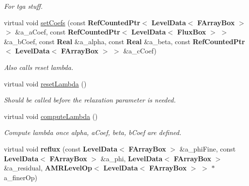 \begin{Indent}
\begin{DoxyCompactItemize}
\begin{DoxyCompactList}\small\item\em For tga stuff. \end{DoxyCompactList}\item 
\mbox{\label{class_darcy_brinkman_op_afc3972638ccf8fb63e080a533f66efcc}} 
virtual void \hyperlink{class_darcy_brinkman_op_afc3972638ccf8fb63e080a533f66efcc}{set\+Coefs} (const \textbf{ Ref\+Counted\+Ptr}$<$ \textbf{ Level\+Data}$<$ \textbf{ F\+Array\+Box} $>$ $>$ \&a\+\_\+a\+Coef, const \textbf{ Ref\+Counted\+Ptr}$<$ \textbf{ Level\+Data}$<$ \textbf{ Flux\+Box} $>$ $>$ \&a\+\_\+b\+Coef, const \textbf{ Real} \&a\+\_\+alpha, const \textbf{ Real} \&a\+\_\+beta, const \textbf{ Ref\+Counted\+Ptr}$<$ \textbf{ Level\+Data}$<$ \textbf{ F\+Array\+Box} $>$ $>$ \&a\+\_\+c\+Coef)
\begin{DoxyCompactList}\small\item\em Also calls reset lambda. \end{DoxyCompactList}\item 
\mbox{\label{class_darcy_brinkman_op_a35fa524145af3a0641f10817ce291b0b}} 
virtual void \hyperlink{class_darcy_brinkman_op_a35fa524145af3a0641f10817ce291b0b}{reset\+Lambda} ()
\begin{DoxyCompactList}\small\item\em Should be called before the relaxation parameter is needed. \end{DoxyCompactList}\item 
\mbox{\label{class_darcy_brinkman_op_aa6b2a052c4d143cd0b946518cd19f313}} 
virtual void \hyperlink{class_darcy_brinkman_op_aa6b2a052c4d143cd0b946518cd19f313}{compute\+Lambda} ()
\begin{DoxyCompactList}\small\item\em Compute lambda once alpha, a\+Coef, beta, b\+Coef are defined. \end{DoxyCompactList}\item 
\mbox{\label{class_darcy_brinkman_op_a1e8a4aec2b75bd325cf0d89feb0f0581}} 
virtual void {\bfseries reflux} (const \textbf{ Level\+Data}$<$ \textbf{ F\+Array\+Box} $>$ \&a\+\_\+phi\+Fine, const \textbf{ Level\+Data}$<$ \textbf{ F\+Array\+Box} $>$ \&a\+\_\+phi, \textbf{ Level\+Data}$<$ \textbf{ F\+Array\+Box} $>$ \&a\+\_\+residual, \textbf{ A\+M\+R\+Level\+Op}$<$ \textbf{ Level\+Data}$<$ \textbf{ F\+Array\+Box} $>$ $>$ $\ast$a\+\_\+finer\+Op)
\end{DoxyCompactItemize}
\end{Indent}
